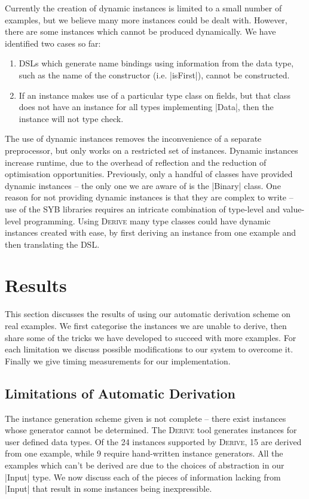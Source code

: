 \documentclass[preprint,draft]{sigplanconf}
\newcommand{\derive}{\textsc{Derive}}
\begin{document}
Currently the creation of dynamic instances is limited to a small number of examples, but we believe many more instances could be dealt with. However, there are some instances which cannot be produced dynamically. We have identified two cases so far:

\begin{enumerate}
\item DSLs which generate name bindings using information from the data type, such as the name of the constructor (i.e. |isFirst|), cannot be constructed.
\item If an instance makes use of a particular type class on fields, but that class does not have an instance for all types implementing |Data|, then the instance will not type check.
\end{enumerate}

The use of dynamic instances removes the inconvenience of a separate preprocessor, but only works on a restricted set of instances. Dynamic instances increase runtime, due to the overhead of reflection and the reduction of optimisation opportunities. Previously, only a handful of classes have provided dynamic instances -- the only one we are aware of is the |Binary| class. One reason for not providing dynamic instances is that they are complex to write -- use of the SYB libraries requires an intricate combination of type-level and value-level programming. Using \derive{} many type classes could have dynamic instances created with ease, by first deriving an instance from one example and then translating the DSL.

\section{Results}
\label{sec:results}

This section discusses the results of using our automatic derivation scheme on real examples. We first categorise the instances we are unable to derive, then share some of the tricks we have developed to succeed with more examples. For each limitation we discuss possible modifications to our system to overcome it. Finally we give timing measurements for our implementation.

\subsection{Limitations of Automatic Derivation}
\label{sec:failure}

The instance generation scheme given is not complete -- there exist instances whose generator cannot be determined. The \derive{} tool \cite{derive} generates instances for user defined data types. Of the 24 instances supported by \derive{}, 15 are derived from one example, while 9 require hand-written instance generators. All the examples which can't be derived are due to the choices of abstraction in our |Input| type. We now discuss each of the pieces of information lacking from |Input| that result in some instances being inexpressible.
\end{document}
